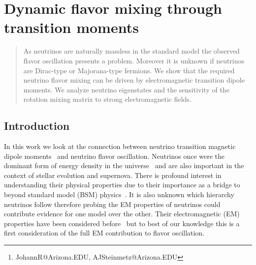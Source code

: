 \documentclass[addchapnum]{ws-rv961x669} %
\begin{document}
\chapter[Dynamic flavor mixing through transition moments]{Dynamic flavor mixing through transition moments\label{JR_ch1}}

\author[J. Rafelski and A. Steinmetz]{Johann Rafelski and Andrew Steinmetz\footnote{JohannR@Arizona.EDU, AJSteinmetz@Arizona.EDU}}

\address{Department of Physics, The University of Arizona, Tucson, AZ 85721, USA}

\begin{abstract} 
As neutrinos are naturally massless in the standard model the observed flavor oscillation presents a problem. Moreover it is unknown if neutrinos are Dirac-type or Majorana-type fermions. We show that the required neutrino flavor mixing can be driven by electromagnetic transition dipole moments. We analyze neutrino eigenstates and the sensitivity of the rotation mixing matrix to strong electromagnetic fields.
\end{abstract}


\body


\section{Introduction}
\label{sec:intro}

In this work we look at the connection between neutrino transition magnetic dipole moments~\cite{Shrock:1980vy,Shrock:1982sc} and neutrino flavor oscillation. Neutrinos once were the dominant form of energy density in the universe~\cite{Rafelski:2023emw} and are also important in the context of stellar evolution and supernova. There is profound interest in understanding their physical properties due to their importance as a bridge to beyond standard model (BSM) physics~\cite{DUNE:2020fgq}. It is also unknown which hierarchy neutrinos follow therefore probing the EM properties of neutrinos could contribute evidence for one model over the other. Their electromagnetic (EM) properties have been considered before~\cite{Giunti:2014ixa,Chukhnova:2019oum,Popov:2019nkr} but to best of our knowledge this is a first consideration of the full EM contribution to flavor oscillation.
\end{document}
